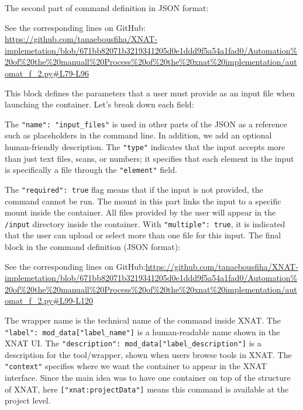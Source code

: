The second part of command definition in JSON format:




\noindent\footnotesize See the corresponding lines on GitHub: \url{ https://github.com/tanaebousfiha/XNAT-implemetation/blob/671bb82071b3219341205d0e1ddd9f5a54a1fad0/Automation%20of%20the%20manuall%20Process%20of%20the%20xnat%20implementation/automat_f_2.py#L79-L96}
\normalsize

This block defines the parameters that a user must provide as an input file when launching the container.
Let’s break down each field:

The \texttt{"name": "input\_files"} is used in other parts of the JSON as a reference such as placeholders in the command line. In addition, we add an optional human-friendly description. The \texttt{"type"} indicates that the input accepts more than just text files, scans, or numbers; it specifies that each element in the input is specifically a file through the \texttt{"element"} field.

The \texttt{"required": true} flag means that if the input is not provided, the command cannot be run. The mount in this part links the input to a specific mount inside the container. All files provided by the user will appear in the \texttt{/input} directory inside the container. With \texttt{"multiple": true}, it is indicated that the user can upload or select more than one file for this input.
The final block in the command definition (JSON format):




\noindent\footnotesize See the corresponding lines on GitHub:\url{https://github.com/tanaebousfiha/XNAT-implemetation/blob/671bb82071b3219341205d0e1ddd9f5a54a1fad0/Automation%20of%20the%20manuall%20Process%20of%20the%20xnat%20implementation/automat_f_2.py#L99-L120}
\normalsize

The wrapper name is the technical name of the command inside XNAT. The \texttt{"label": mod\_data["label\_name"]} is a human-readable name shown in the XNAT \ac{UI}. The \texttt{"description": mod\_data["label\_description"]} is a description for the tool/wrapper, shown when users browse tools in XNAT. The \texttt{"context"} specifies where we want the container to appear in the XNAT interface. Since the main idea was to have one container on top of the structure of XNAT, here \texttt{["xnat:projectData"]} means this command is available at the project level.


